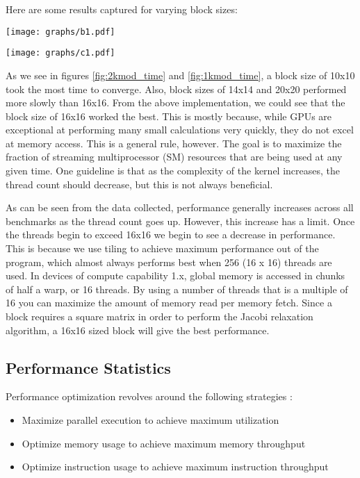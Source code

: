 \documentclass[10pt]{article}
\makeatletter
\newenvironment{figurehere}
{\def\@captype{figure}}
{}
\makeatother
\begin{document}
\begin{multicols}{2}
  Here are some results captured for varying block sizes:

  \begin{figurehere}
    \centering
    \texttt{[image: graphs/b1.pdf]}
    \caption{}
    \label{fig:2kmod_time}
  \end{figurehere}

  \begin{figurehere}
    \centering
    \texttt{[image: graphs/c1.pdf]}
    \caption{}
    \label{fig:1kmod_time}
  \end{figurehere}

  As we see in figures \ref{fig:2kmod_time} and \ref{fig:1kmod_time}, a block size of 10x10 took the most time to converge.
  Also, block sizes of 14x14 and 20x20 performed more slowly than 16x16.
  From the above implementation, we could see that the block size of 16x16 worked the best.
  This is mostly because, while GPUs are exceptional at performing many small calculations very quickly, they do not excel at memory access.
  This is a general rule, however.
  The goal is to maximize the fraction of streaming multiprocessor (SM) resources that are being used at any given time.
  One guideline is that as the complexity of the kernel increases, the thread count should decrease, but this is not always beneficial.

  As can be seen from the data collected, performance generally increases across all benchmarks as the thread count goes up.
  However, this increase has a limit.
  Once the threads begin to exceed 16x16 we begin to see a decrease in performance.
  This is because we use tiling to achieve maximum performance out of the program, which almost always performs best when 256 (16 x 16) threads are used.
  In devices of compute capability 1.x, global memory is accessed in chunks of half a warp, or 16 threads.
  By using a number of threads that is a multiple of 16 you can maximize the amount of memory read per memory fetch.
  Since a block requires a square matrix in order to perform the Jacobi relaxation algorithm, a 16x16 sized block will give the best performance.

  \subsection{Performance Statistics}
  Performance optimization revolves around the following strategies \cite{bib:nvidia}:
  \begin{itemize}
    \item Maximize parallel execution to achieve maximum utilization
    \item Optimize memory usage to achieve maximum memory throughput 
    \item Optimize instruction usage to achieve maximum instruction throughput 
  \end{itemize}


\end{multicols}
\end{document}
